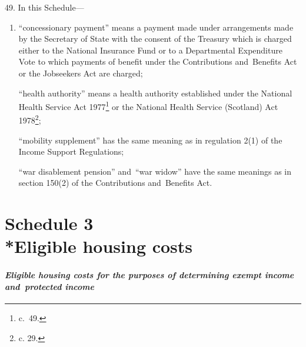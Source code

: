 \documentclass[12pt,a4paper]{article}
\begin{document}
\medskip



\medskip

49.  In this Schedule—
\begin{enumerate}\item[]
“concessionary payment” means a payment made under arrangements made by the Secretary of State with the consent of the Treasury which is charged either to the National Insurance Fund or to a Departmental Expenditure Vote to which payments of benefit under the Contributions and~Benefits Act 
or the Jobseekers Act  %
are charged;

“health authority” means a health authority established under the National Health Service Act 1977\footnote{ c.~49.} or the National Health Service (Scotland) Act 1978\footnote{ c. 29.};

“mobility supplement” has the same meaning as in regulation 2(1) of the Income Support Regulations;

“war disablement pension” and~“war widow” have the same meanings as in section 150(2) of the Contributions and~Benefits Act.
\end{enumerate}


\part[Schedule 3 --- Eligible housing costs]{Schedule 3\\*Eligible housing costs}

\renewcommand\parthead{--- Schedule 3}

\subsection*{\itshape Eligible housing costs for the purposes of determining exempt income and~protected income}
\end{document}
